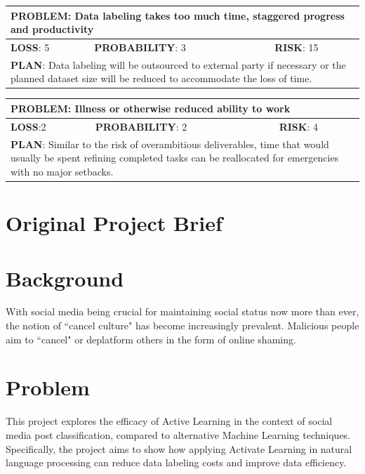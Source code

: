 \documentclass[a4paper,12pt]{article}
\begin{document}
\begin{tabular}{|l|l|l|}
\hline
\multicolumn{3}{|l|}{\parbox[t]{\textwidth-1.15cm}{\textbf{PROBLEM}: Data labeling takes too much time, staggered progress and productivity\vspace{.2\baselineskip}}} \\ \hline
\textbf{LOSS}: 5& \textbf{PROBABILITY}: 3&\textbf{RISK}: 15\\ \hline
\multicolumn{3}{|l|}{\parbox[t]{\textwidth-1.15cm}{\textbf{PLAN}: Data labeling will be outsourced to external party if necessary or the planned dataset size will be reduced to accommodate the loss of time.}} \\ \hline
\end{tabular}

\begin{tabular}{|l|l|l|}
\hline
\multicolumn{3}{|l|}{\parbox[t]{\textwidth-1.15cm}{\textbf{PROBLEM}: Illness or otherwise reduced ability to work}} \\ \hline
\textbf{LOSS}:2 & \textbf{PROBABILITY}: 2&\textbf{RISK}: 4\\ \hline
\multicolumn{3}{|l|}{\parbox[t]{\textwidth-1.15cm}{\textbf{PLAN}: Similar to the risk of overambitious deliverables, time that would usually be spent refining completed tasks can be reallocated for emergencies with no major setbacks.}} \\ \hline
\end{tabular}
\newpage


\newpage
\appendix
\section{Original Project Brief}
\section*{Background}
With social media being crucial for maintaining social status now more than ever, the notion of ``cancel culture" has become increasingly prevalent. Malicious people aim to ``cancel" or deplatform others in the form of online shaming.
\section*{Problem}
This project explores the efficacy of Active Learning in the context of social media post classification, compared to alternative Machine Learning techniques. Specifically, the project aims to show how applying Activate Learning in natural language processing can reduce data labeling costs and improve data efficiency.
\end{document}
